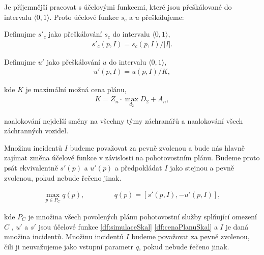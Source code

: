 Je příjemnější pracovat s účelovými funkcemi, které jsou přeškálované do intervalu $\langle 0, 1 \rangle$.
Proto účelové funkce $s_c$ a $u$ přeškálujeme:

\begin{definice} \label{df:simulaceSkal}
  Definujme $s'_c$ jako přeškálování $s_c$ do intervalu $\langle 0, 1 \rangle$,
  \begin{align*}
    s'_c(p, I) = s_c(p, I) / |I|.
  \end{align*}
\end{definice}

\begin{definice} \label{df:cenaPlanuSkal}
  Definujme $u'$ jako přeškálování $u$ do intervalu $\langle 0, 1 \rangle$,
  \begin{align*}
    u'(p, I) = u(p, I) / K,
  \end{align*}

  kde $K$ je maximální možná cena plánu,
  \begin{align*}
    K = Z_n \cdot \max_{d_2} D_2 + A_n,
  \end{align*}

  naalokování nejdelší směny na všechny týmy záchranářů a naalokování všech záchranných vozidel.
\end{definice}

Množinu incidentů $I$ budeme považovat za pevně zvolenou a bude nás hlavně zajímat změna účelové funkce v závislosti na pohotovostním plánu.
Budeme proto psát ekvivalentně $s'(p)$ a $u'(p)$ a předpokládat $I$ jako stejnou a pevně zvolenou, pokud nebude řečeno jinak. 

\begin{definice}\label{df:optUloha2uc}
  \begin{align*}
    \max_{p \in P_C} q(p), \hspace{50pt} q(p) = [s'(p, I), -u'(p, I)],
  \end{align*}

  kde $P_C$ je množina všech povolených plánu pohotovostní služby splňující omezení $C$
  , $u'$ a $s'$ jsou účelové funkce \ref{df:simulaceSkal} \ref{df:cenaPlanuSkal} a $I$ je daná množina incidentů.
  Množinu incidentů $I$ budeme považovat za pevně zvolenou, čili ji neuvažujeme jako vstupní parametr $q$, pokud nebude řečeno jinak.
\end{definice}

